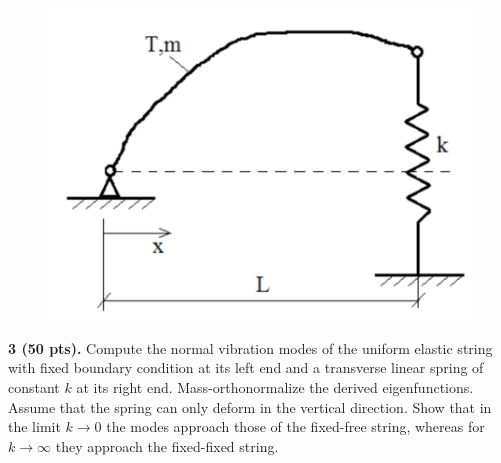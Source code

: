 \begin{problem}
\begin{figure}
    \vspace{-16pt}
    \centering
    \includegraphics[width=0.9\linewidth]{homework/hw2/assets/hw2_p3.png}
\end{figure}
\textbf{3 (50 pts).} Compute the normal vibration modes of the uniform elastic string with fixed boundary condition at its left end and a transverse linear spring of constant $k$ at its right end. 
Mass-orthonormalize the derived eigenfunctions. 
Assume that the spring can only deform in the vertical direction. 
Show that in the limit $k\rightarrow 0$ the modes approach those of the fixed-free string, whereas for $k\rightarrow \infty$ they approach the fixed-fixed string.
\end{problem}

